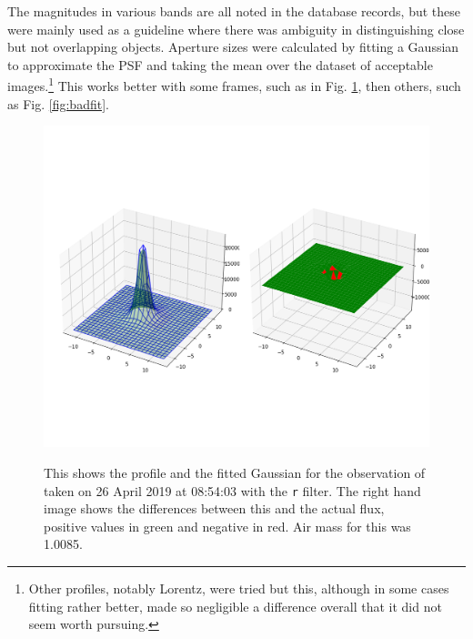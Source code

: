 The magnitudes in various bands are all noted in the database records, but these
were mainly used as a guideline where there was ambiguity in distinguishing
close but not overlapping objects. Aperture sizes were calculated by fitting a
Gaussian to approximate the PSF and taking the mean over the dataset of
acceptable images.\footnote{Other profiles, notably Lorentz, were tried but
this, although in some cases fitting rather better, made so negligible a
difference overall that it did not seem worth pursuing.} This works better with
some frames, such as in Fig.
\ref{fig:goodfit}, then others, such as Fig. \ref{fig:badfit}.

\begin{figure}[!htbp]
\begin{center}
\includegraphics[scale=0.40]{images/goodfit.png} \\
\vspace{-.5cm}
\end{center}
\caption{This shows the profile and the fitted
Gaussian for the observation of {\ross} taken on 26
April 2019 at 08:54:03 with the \texttt{r} filter. The right
hand image shows the differences between this and
the actual flux, positive values in green and
negative in red. Air mass for this was 1.0085.}
\protect\label{fig:goodfit}
\end{figure}

